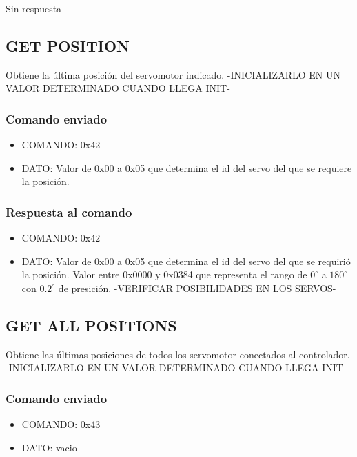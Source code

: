 \documentclass[a4paper,11pt]{article}
\begin{document}
Sin respuesta

\subsection{GET POSITION}
\label{set_position}

Obtiene la \'ultima posici\'on del servomotor indicado. -INICIALIZARLO EN UN VALOR DETERMINADO CUANDO LLEGA INIT-

\subsubsection*{Comando enviado}
\label{set_position_comando_enviado}

\begin{itemize}
	\item{COMANDO:} 0x42
	\item{DATO:} Valor de 0x00 a 0x05 que determina el id del servo del que se requiere la posici\'on.
\end{itemize}

\subsubsection*{Respuesta al comando}
\label{set_position_respuesta}

\begin{itemize}
	\item{COMANDO:} 0x42
	\item{DATO:} Valor de 0x00 a 0x05 que determina el id del servo del que se requiri\'o la posici\'on.
	Valor entre 0x0000 y 0x0384 que representa el rango de $0^{\circ}$ a $180^{\circ}$ con $0.2^{\circ}$ de presici\'on. -VERIFICAR POSIBILIDADES EN LOS SERVOS-
\end{itemize}

\subsection{GET ALL POSITIONS}
\label{get_all_position}

Obtiene las \'ultimas posiciones de todos los servomotor conectados al controlador. -INICIALIZARLO EN UN VALOR DETERMINADO CUANDO LLEGA INIT-

\subsubsection*{Comando enviado}
\label{get_all_position_comando_enviado}

\begin{itemize}
	\item{COMANDO:} 0x43
	\item{DATO:} vacio
\end{itemize}
\end{document}
